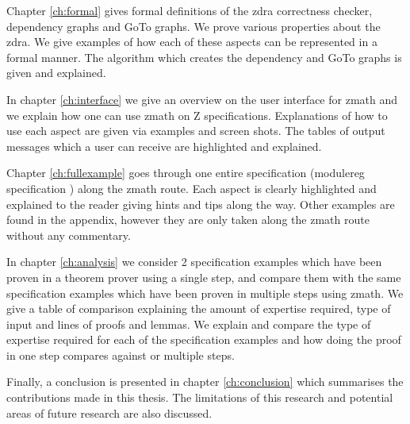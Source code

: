 Chapter \ref{ch:formal} gives formal definitions of the \gls{zdra} correctness checker, dependency graphs and GoTo graphs. We prove various properties about the \gls{zdra}. We give examples of how each of these aspects can be represented in a formal manner. The algorithm which creates the dependency and GoTo graphs is given and explained.

In chapter \ref{ch:interface} we give an overview on the user interface for \gls{zmath} and we explain how one can use \gls{zmath} on Z specifications. Explanations of how to use each aspect are given via examples and screen shots. The tables of output messages which a user can receive are highlighted and explained.

Chapter \ref{ch:fullexample} goes through one entire specification (modulereg specification \cite{essenceofz}) along the \gls{zmath} route. Each aspect is clearly highlighted and explained to the reader giving hints and tips along the way. Other examples are found in the appendix, however they are only taken along the \gls{zmath} route without any commentary.

In chapter \ref{ch:analysis} we consider 2 specification examples which have been proven in a theorem prover using a single step, and compare them with the same specification examples which have been proven in multiple steps using \gls{zmath}. We give a table of comparison explaining the amount of expertise required, type of input and lines of proofs and lemmas. We explain and compare the type of expertise required for each of the specification examples and how doing the proof in one step compares against or multiple steps.

Finally, a conclusion is presented in chapter \ref{ch:conclusion} which summarises the contributions made in this thesis. The limitations of this research and potential areas of future research are also discussed.
